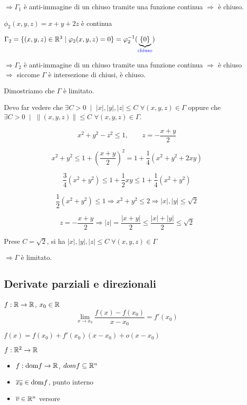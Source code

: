\begin{exbar}
\begin{example}
	$\Rightarrow \Gamma_1$ è anti-immagine di un chiuso tramite una funzione continua $\Rightarrow$ è chiuso.
	\begin{center}	
		$\phi_2(x,y,z)=x+y+2z$ è continua
	
		$\Gamma_2=\{(x,y,z)\in\mathbb{R}^3\mid \varphi_2(x,y,z)= 0\}=\varphi_2^{-1}(\underbrace{\{0\}}_{{\color{blue} \text{chiuso}}})$
	\end{center}
	
	$\Rightarrow\Gamma_2$ è anti-immagine di un chiuso tramite una funzione continua $\Rightarrow$ è chiuso $\Rightarrow$ siccome $\Gamma$ è intersezione di chiusi, è chiuso.
	
	Dimostriamo che $\Gamma $ è limitato.
	
	Devo far vedere che $\exists C>0 \;\mid$ $|x|,|y|,|z|\leq C$ $\forall (x,y,z)\in \Gamma$ oppure che $\exists C>0 \; \mid$ $\|(x,y,z)\|\leq C$ $\forall(x,y,z)\in\Gamma$.
	
	$$x^2+y^2-z^2\leq 1, \qquad z=-\frac{x+y}{2}$$
	
	$$x^2+y^2\leq 1+\left(\frac{x+y}{2}\right)^2=1+\frac{1}{4}(x^2+y^2+2xy)$$
	
	$$\frac{3}{4}(x^2+y^2)\leq 1+\frac{1}{2}xy\leq 1+\frac{1}{4}(x^2+y^2)$$
	
	$$\frac{1}{2}(x^2+y^2)\leq 1\Rightarrow x^2+y^2\leq 2\Rightarrow |x|,|y|\leq \sqrt{2}$$
	
	$$z=-\frac{x+y}{2}\Rightarrow |z|=\frac{|x+y|}{2}\leq \frac{|x|+|y|}{2}\leq \sqrt{2}$$
	
	Prese $C=\sqrt{2}$, si ha $|x|,|y|,|z|\leq C \; \forall(x,y,z)\in \Gamma$
	
	{\centering $\Rightarrow\Gamma$ è limitato. \par}
\end{example}
\end{exbar}


\subsection{Derivate parziali e direzionali}
$f:\mathbb{R}\rightarrow\mathbb{R}$, $x_0\in\mathbb{R}$
\begin{equation*}
	\lim_{x \rightarrow x_0}\frac{f(x)-f(x_0)}{x-x_0}=f'(x_0)
\end{equation*}

$f(x)=f(x_0)+f'(x_0)(x-x_0)+o(x-x_0)$

$f:\mathbb{R}^2\rightarrow\mathbb{R}$


\begin{itemize}
	\item $f:\mathrm{dom} f\rightarrow\mathbb{R}$, $domf \subseteq \mathbb{R}^n$
	\item $\overline{x_0}\in \mathrm{dom} f$, punto interno
	\item $\overline{v}\in \mathbb{R}^n$ versore
\end{itemize}

